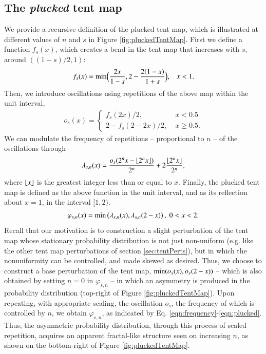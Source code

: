 \documentclass[preprint,12pt]{elsarticle}
\DeclarePairedDelimiter{\floor}{\lfloor}{\rfloor}
\begin{document}
\subsection{The \emph{plucked} tent map}
\label{sec:pluckedTentMap}
We provide a recursive definition of the plucked tent map, which 
is illustrated at different values of $n$ and $s$ in Figure \ref{fig:pluckedTentMap}. First we define a function $f_s(x)$, which 
creates a bend in the tent map that increases with $s$, around 
$((1-s)/2,1)$:
\begin{align}
		f_s(x) = 		{\rm min}\Big(
				\dfrac{2x}{1-s}, 2 - \dfrac{2(1-x)}{1+s}\Big),
				\;\;\; x < 1. 
\end{align}
Then, we introduce oscillations using repetitions of
the above map within the unit interval,
\begin{align}
		o_s(x) = \begin{cases}
				f_s(2x)/2, & \; x < 0.5 \\
				2 - f_s(2-2x)/2, & \; x \ge 0.5.
		\end{cases}
\end{align}
We can modulate
the frequency of repetitions -- proportional to $n$ -- 
of the oscillations through
\begin{align}
		\label{eqn:frequency}
		\lambda_{s,n}(x) = \dfrac{o_s(2^n x - \floor*{2^n x})}{2^n} 
		+ 2 \frac{\floor*{2^n x}}{2^n},
\end{align}
where $\floor*{x}$ is the greatest integer less than or equal to $x$.
Finally, the plucked tent map is defined as the above function 
in the unit interval, and as its reflection about $x=1$,
in the interval $[1,2)$.
\begin{align}
		\label{eqn:plucked}
		\varphi_{s,n}(x) = {\rm min}\left(
		\lambda_{s,n}(x), \lambda_{s,n}(2-x)\right), \; 0< x < 2. 
\end{align}
Recall that our motivation is to construction a slight perturbation of the tent map whose stationary probability distribution is not just 
non-uniform (e.g. like the other tent map perturbations of section \ref{sec:tentPerts}), but in which the nonuniformity can be controlled, and made skewed as desired. Thus, we choose to construct a base perturbation of the tent map, ${\rm min}(o_s(x), o_s(2-x))$ -- 
which is also obtained by setting $n=0$ in $\varphi_{s,n}$ --  
in which an asymmetry is produced in the probability distribution (top-right of Figure \ref{fig:pluckedTentMap}).
Upon repeating, with appropriate scaling, the oscillation $o_s$, 
the frequency of which is controlled by $n$, we obtain $\varphi_{s,n}$, 
as indicated by Eq. \ref{eqn:frequency}-\ref{eqn:plucked}. Thus, the asymmetric probability distribution, through this process of scaled repetition, acquires an apparent fractal-like structure seen on increasing $n$, as shown on the bottom-right of Figure \ref{fig:pluckedTentMap}.
\end{document}
